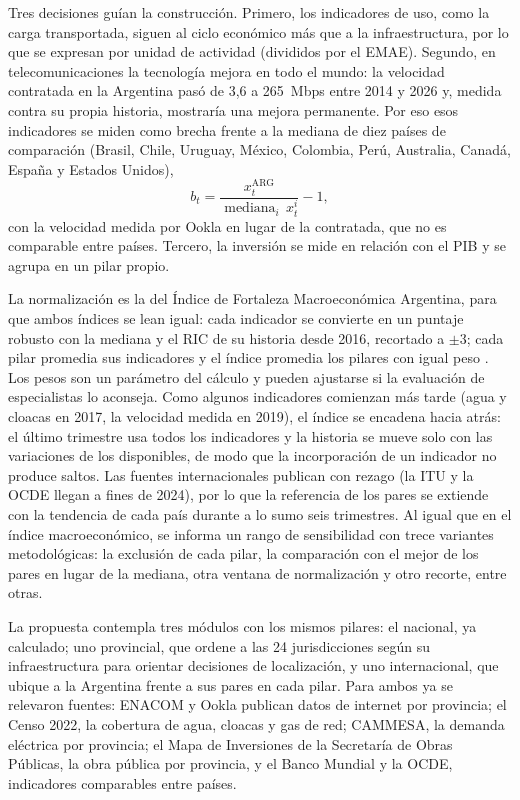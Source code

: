 Tres decisiones guían la construcción. Primero, los indicadores de uso, como la carga transportada, siguen al ciclo económico más que a la infraestructura, por lo que se expresan por unidad de actividad (divididos por el EMAE). Segundo, en telecomunicaciones la tecnología mejora en todo el mundo: la velocidad contratada en la Argentina pasó de 3,6 a 265~Mbps entre 2014 y 2026 \cite{enacom_internet} y, medida contra su propia historia, mostraría una mejora permanente. Por eso esos indicadores se miden como brecha frente a la mediana de diez países de comparación (Brasil, Chile, Uruguay, México, Colombia, Perú, Australia, Canadá, España y Estados Unidos),
\begin{equation*}
b_t = \frac{x^{\text{ARG}}_t}{\operatorname{mediana}_i\, x^{i}_t} - 1,
\end{equation*}
con la velocidad medida por Ookla \cite{ookla} en lugar de la contratada, que no es comparable entre países. Tercero, la inversión se mide en relación con el PIB y se agrupa en un pilar propio.

La normalización es la del Índice de Fortaleza Macroeconómica Argentina, para que ambos índices se lean igual: cada indicador se convierte en un puntaje robusto con la mediana y el RIC de su historia desde 2016, recortado a $\pm 3$; cada pilar promedia sus indicadores y el índice promedia los pilares con igual peso \cite{oecd2008}. Los pesos son un parámetro del cálculo y pueden ajustarse si la evaluación de especialistas lo aconseja. Como algunos indicadores comienzan más tarde (agua y cloacas en 2017, la velocidad medida en 2019), el índice se encadena hacia atrás: el último trimestre usa todos los indicadores y la historia se mueve solo con las variaciones de los disponibles, de modo que la incorporación de un indicador no produce saltos. Las fuentes internacionales publican con rezago (la ITU y la OCDE llegan a fines de 2024), por lo que la referencia de los pares se extiende con la tendencia de cada país durante a lo sumo seis trimestres. Al igual que en el índice macroeconómico, se informa un rango de sensibilidad con trece variantes metodológicas: la exclusión de cada pilar, la comparación con el mejor de los pares en lugar de la mediana, otra ventana de normalización y otro recorte, entre otras.

La propuesta contempla tres módulos con los mismos pilares: el nacional, ya calculado; uno provincial, que ordene a las 24 jurisdicciones según su infraestructura para orientar decisiones de localización, y uno internacional, que ubique a la Argentina frente a sus pares en cada pilar. Para ambos ya se relevaron fuentes: ENACOM y Ookla publican datos de internet por provincia; el Censo 2022, la cobertura de agua, cloacas y gas de red; CAMMESA, la demanda eléctrica por provincia; el Mapa de Inversiones de la Secretaría de Obras Públicas, la obra pública por provincia, y el Banco Mundial y la OCDE, indicadores comparables entre países.

